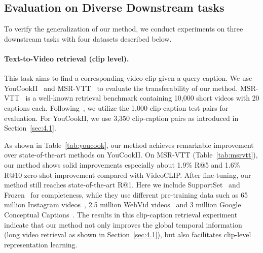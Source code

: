 \subsection{Evaluation on Diverse Downstream tasks}
To verify the generalization of our method, we conduct experiments on three downstream tasks with four datasets described below. 

\paragraph{Text-to-Video retrieval (clip level).} This task aims to find a corresponding video clip given a query caption. We use YouCookII~\citep{youcook} and MSR-VTT~\citep{msrvtt} to evaluate the transferability of our method. MSR-VTT~\citep{msrvtt} is a well-known retrieval benchmark containing 10,000 short videos with 20 captions each. Following~\cite{videoclip}, we utilize the 1,000 clip-caption test pairs for evaluation. For YouCookII, we use 3,350 clip-caption pairs as introduced in Section~\ref{sec:4.1}. 

As shown in Table~\ref{tab:youcook}, our method achieves remarkable improvement over state-of-the-art methods on YouCookII. On MSR-VTT (Table~\ref{tab:msrvtt}), our method shows solid improvements especially about 1.9\% R@5 and 1.6\% R@10 zero-shot improvement compared with VideoCLIP. After fine-tuning, our method still reaches state-of-the-art R@1. Here we include SupportSet~\citep{supportset} and Frozen~\citep{bain2021frozen} for completeness, while they use different pre-training data such as 65 million Instagram videos~\citep{ghadiyaram2019large}, 2.5 million WebVid videos~\citep{bain2021frozen} and 3 million Google Conceptual Captions~\citep{sharma2018conceptual}.
The results in this clip-caption retrieval experiment indicate that our method not only improves the global temporal information (long video retrieval as shown in Section~\ref{sec:4.1}), but also facilitates clip-level representation learning.

